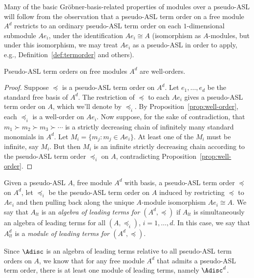 \documentclass[11pt,reqno]{amsart}
\newcommand{\suchthat}{:}
\theoremstyle{definition}
\numberwithin{equation}{section}
\begin{document}
Many of the basic Gröbner-basis-related properties of modules over a pseudo-ASL will follow from the observation that a pseudo-ASL term order on a free module $A^d$ restricts to an ordinary pseudo-ASL term order on each $1$-dimensional submodule $Ae_i$, under the identification $Ae_i \cong A$ (isomorphism as $A$-modules, but under this isomorphism, we may treat $Ae_i$ as a pseudo-ASL in order to apply, e.g., Definition~\ref{def:termorder} and others).

\begin{proposition}
\label{prop:ato-are-well}
Pseudo-ASL term orders on free modules $A^d$ are well-orders.
\end{proposition}

\begin{proof}
Suppose $\preceq$ is a pseudo-ASL term order on $A^d$. Let $e_1,\dotsc,e_d$ be the standard free basis of $A^d$. The restriction of $\preceq$ to each $Ae_i$ gives a pseudo-ASL term order on $A$, which we'll denote by $\preceq_i$. By Proposition~\ref{prop:well-order}, each $\preceq_i$ is a well-order on $Ae_i$. Now suppose, for the sake of contradiction, that $m_1 \succ m_2 \succ m_3 \succ \dotsb$ is a strictly decreasing chain of infinitely many standard monomials in $A^d$. Let $M_i = \{m_j \suchthat m_j \in Ae_i\}$. At least one of the $M_i$ must be infinite, say $M_i$. But then $M_i$ is an infinite strictly decreasing chain according to the pseudo-ASL term order $\preceq_i$ on $A$, contradicting Proposition~\ref{prop:well-order}.
\end{proof}

\begin{definition}[store=defmlt, note={Algebra of leading terms for a module; module of leading terms}] 
\label{def:MLT}
Given a pseudo-ASL $A$, free module $A^d$ with basis, a pseudo-ASL term order $\preceq$ on $A^d$, let $\preceq_i$ be the pseudo-ASL term order on $A$ induced by restricting $\preceq$ to $Ae_i$ and then pulling back along the unique $A$-module isomorphism $Ae_i \cong A$. We say that $A_{lt}$ is an \emph{algebra of leading terms for $(A^d, \preceq)$} if $A_{lt}$ is simultaneously an algebra of leading terms for all $(A, \preceq_i)$, $i=1,\dotsc,d$. In this case, we say that $A_{lt}^d$ is a \emph{module of leading terms for $(A^d, \preceq)$}.
\end{definition}

Since $\Adisc$ is an algebra of leading terms relative to all pseudo-ASL term orders on $A$, we know that for any free module $A^d$ that admits a pseudo-ASL term order, there is at least one module of leading terms, namely $\Adisc^d$.
\end{document}
